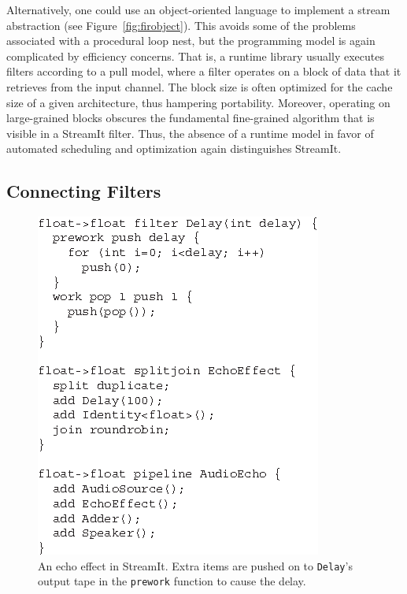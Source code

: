 Alternatively, one could use an object-oriented language to  implement a stream
abstraction (see  Figure~\ref{fig:firobject}).  This avoids  some of the
problems associated  with a procedural loop nest,  but the programming
model is again complicated by efficiency concerns.  That is, a runtime
library usually  executes filters according  to a pull model,  where a
filter operates  on a block of  data that it retrieves  from the input
channel.  The  block size is often  optimized for the cache  size of a
given architecture, thus hampering portability.  Moreover, operating on
large-grained blocks  obscures the fundamental  fine-grained algorithm
that is visible in a StreamIt  filter.  Thus, the absence of a runtime
model  in  favor  of   automated  scheduling  and  optimization  again
distinguishes StreamIt.

\subsection{Connecting Filters}
\label{sec:connecting}

\begin{figure}
\centering
\includegraphics{echo.eps}
\caption{An echo effect in StreamIt.  Extra items are pushed on to
  \texttt{Delay}'s output tape in the \texttt{prework} function to
  cause the delay.}
\label{fig:echo}
\end{figure}

